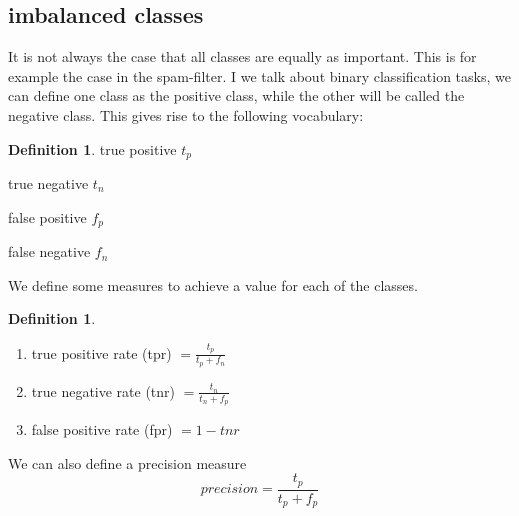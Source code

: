 \documentclass[a4paper, 12pt]{article}
\theoremstyle{plain}
\theoremstyle{definition}
\newtheorem{definition}[theorem]{Definition} %
\theoremstyle{lemma}
\theoremstyle{remark}
\theoremstyle{example}
\begin{document}
	\subsection{imbalanced classes}
	It is not always the case that all classes are equally as important. This is for example the case in the spam-filter. I we talk about binary classification tasks, we can define one class as the positive class, while the other will be called the negative class. This gives rise to the following vocabulary: \begin{definition}
		\item true positive $t_p$ 
		\item true negative $t_n$
		\item false positive $f_p$
		\item false negative $f_n$
	\end{definition}
	We define some measures to achieve a value for each of the classes.
	\begin{definition}
		\begin{enumerate}
			\item true positive rate (tpr) $=\frac{t_p}{t_p+f_n}$
			\item true negative rate (tnr) $=\frac{t_n}{t_n+f_p}$
			\item false positive rate (fpr) $= 1-tnr$		
		\end{enumerate}
		We can also define a precision measure \[precision = \frac{t_p}{t_p+f_p}\]
	\end{definition}
\end{document}

